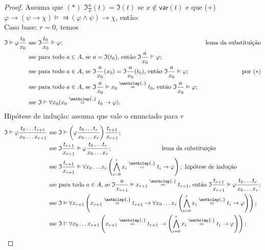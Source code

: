 \documentclass[11pt]{article}
\newcommand{\mf}[1]{\mathfrak{#1}}
\newcommand{\msf}[1]{\mathsf{#1}}
\newcommand\overtext[2]{\stackrel{\mathclap{\normalfont\mbox{#1}}}{#2}}
\begin{document}
\begin{proof}
    Assuma que $(*)$ $\mf{I}\frac{a}{x}(t)=\mf{I}(t)$ se $x\notin\msf{var}(t)$ e que (+) $\varphi\rightarrow(\psi\rightarrow\chi)\vDash\Dashv(\varphi\wedge\psi)\rightarrow\chi$, então:\\
    Caso base: $r = 0$, temos
    \begin{align*}
        \mf{I}\vDash\varphi\frac{t_0}{x_0} & \text{ sse }\mf{I}\frac{t_0}{x_0}\vDash\varphi; & \text{ lema da substituição}\\
        & \text{ sse para todo }a\in A\text{, se }a=\mf{I}(t_0)\text{, então }\mf{I}\frac{a}{x_0}\vDash\varphi; &  \\
        & \text{ sse para todo }a\in A\text{, se }\mf{I}\frac{a}{x_0}(x_0)=\mf{I}\frac{a}{x_0}(t_0)\text{, então }\mf{I}\frac{a}{x_0}\vDash\varphi; & \text{ por }(*)\\
        & \text{ sse para todo }a\in A\text{, se }\mf{I}\frac{a}{x_0}\vDash x_0\overtext{.}{=}t_0\text{, então }\mf{I}\frac{a}{x_0}\vDash\varphi; &\\
        & \text{ sse }\mf{I}\vDash\forall x_0(x_0\overtext{.}{=}t_0\rightarrow\varphi). &
    \end{align*}
    Hipótese de indução: assuma que vale o enunciado para $r$
    \begin{align*}
        \mf{I}\vDash\varphi\frac{t_0\dots t_{r+1}}{x_0\dots x_{r+1}} & \text{ sse }\mf{I}\vDash\left(\varphi\frac{t_0\dots t_r}{x_0\dots x_r}\right)\frac{t_{r+1}}{x_{r+1}};\\
        & \text{ sse }\mf{I}\frac{t_{r+1}}{x_{r+1}}\vDash\varphi\frac{t_0\dots t_r}{x_0\dots x_r};~~~~~~~~~~~~~~~~~~~~~~~~\text{ lema da substituição}\\
        & \text{ sse }\mf{I}\frac{t_{r+1}}{x_{r+1}}\vDash\forall x_0\dots x_r\left(\bigwedge_{i=0}^rx_i\overtext{.}{=}t_i\rightarrow\varphi\right);\text{ hipótese de indução}\\
        & \text{ sse para todo }a\in A\text{, se }\mf{I}\frac{a}{x_{r+1}}\vDash x_{r+1}\overtext{.}{=}t_{r+1}\text{, então }\mf{I}\frac{t_{r+1}}{x_{r+1}}\vDash\varphi\frac{t_0\dots t_r}{x_0\dots x_r};\\
        & \text{ sse }\mf{I}\vDash\forall x_{r+1}\left(x_{r+1}\overtext{.}{=}t_{r+1}\rightarrow\forall x_0\dots x_r\left(\bigwedge_{i=0}^rx_i\overtext{.}{=}t_i\rightarrow\varphi\right)\right);\\
        & \text{ sse }\mf{I}\vDash\forall x_0\dots x_{r+1}\left(x_{r+1}\overtext{.}{=}t_{r+1}\rightarrow\left(\bigwedge_{i=0}^rx_i\overtext{.}{=}t_i\rightarrow\varphi\right)\right);\\

\end{align*}
\end{proof}
\end{document}
